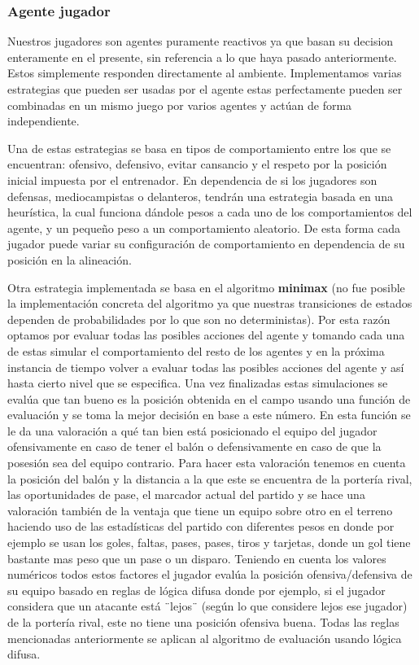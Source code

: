 \documentclass{article}
\begin{document}
\subsubsection{Agente jugador}
Nuestros jugadores son agentes puramente reactivos ya que basan su decision enteramente en el presente, sin referencia 
a lo que haya pasado anteriormente. Estos simplemente responden directamente al ambiente. Implementamos varias 
estrategias que pueden ser usadas por el agente estas perfectamente pueden ser combinadas en un mismo juego por 
varios agentes y actúan de forma independiente.

Una de estas estrategias se basa en tipos de comportamiento entre los que se encuentran: ofensivo, defensivo, evitar 
cansancio y el respeto por la posición inicial impuesta por el entrenador. En dependencia de si los jugadores son 
defensas, mediocampistas o delanteros, tendrán una estrategia basada en una heurística, la cual funciona dándole 
pesos a cada uno de los comportamientos del agente, y un pequeño peso a un comportamiento aleatorio. De esta forma 
cada jugador puede variar su configuración de comportamiento en dependencia de su posición en la alineación.

Otra estrategia implementada se basa en el algoritmo \textbf{minimax} (no fue posible la implementación concreta del algoritmo
ya que nuestras transiciones de estados dependen de probabilidades por lo que son no deterministas). Por esta razón 
optamos por evaluar todas las posibles acciones del agente y tomando cada una de estas simular el comportamiento del 
resto de los agentes y en la próxima instancia de tiempo volver a evaluar todas las posibles acciones del agente y así 
hasta cierto nivel que se especifica. Una vez finalizadas estas simulaciones se evalúa que tan bueno es la posición 
obtenida en el campo usando una función de evaluación y se toma la mejor decisión en base a este número. En esta 
función se le da una valoración a qué tan bien está posicionado el equipo del jugador ofensivamente en caso de tener 
el balón o defensivamente en caso de que la posesión sea del equipo contrario. Para hacer esta valoración tenemos en 
cuenta la posición del balón y la distancia a la que este se encuentra de la portería rival, las oportunidades de 
pase, el marcador actual del partido y se hace una valoración también de la ventaja que tiene un equipo sobre otro 
en el terreno haciendo uso de las estadísticas del partido con diferentes pesos en donde por ejemplo se usan los 
goles, faltas, pases, pases, tiros y tarjetas, donde un gol tiene bastante mas peso que un pase  o un disparo. 
Teniendo en cuenta los valores numéricos todos estos factores el jugador evalúa la posición ofensiva/defensiva de 
su equipo basado en reglas de lógica difusa donde por ejemplo, si el jugador considera que un atacante está ¨lejos¨ 
(según lo que considere lejos ese jugador) de la portería rival, este no tiene una posición ofensiva buena.
Todas las reglas mencionadas anteriormente se aplican al algoritmo de evaluación usando lógica difusa.
\end{document}
